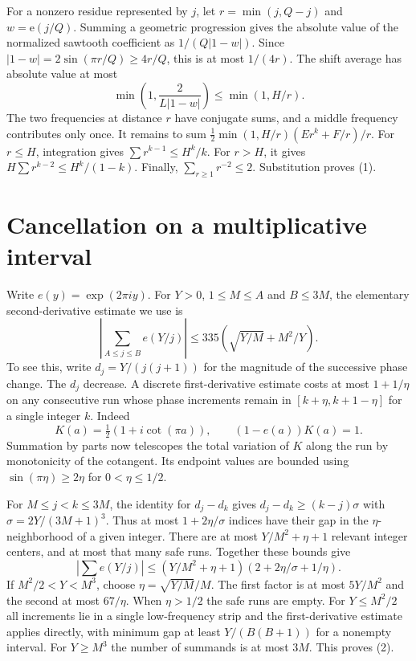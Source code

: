 \documentclass[10pt]{article}
\newcommand{\ee}{\mathrm{e}}
\begin{document}
For a nonzero residue represented by $j$, let $r=\min(j,Q-j)$ and $w=\ee(j/Q)$. Summing a geometric progression gives the absolute value of the normalized sawtooth coefficient as $1/(Q|1-w|)$. Since $|1-w|=2\sin(\pi r/Q)\ge4r/Q$, this is at most $1/(4r)$. The shift average has absolute value at most
\[
 \min\left(1,\frac{2}{L|1-w|}\right)\le\min(1,H/r).
\]
The two frequencies at distance $r$ have conjugate sums, and a middle frequency contributes only once. It remains to sum $\tfrac12\min(1,H/r)(E r^k+F/r)/r$. For $r\le H$, integration gives $\sum r^{k-1}\le H^k/k$. For $r>H$, it gives $H\sum r^{k-2}\le H^k/(1-k)$. Finally, $\sum_{r\ge1}r^{-2}\le2$. Substitution proves (1).

\newpage
\section*{Cancellation on a multiplicative interval}
Write $e(y)=\exp(2\pi i y)$. For $Y>0$, $1\le M\le A$ and $B\le3M$, the elementary second-derivative estimate we use is
\begin{equation}
 \left|\sum_{A\le j\le B}e(Y/j)\right|\le335\left(\sqrt{Y/M}+M^2/Y\right).
 \tag{2}
\end{equation}
To see this, write $d_j=Y/(j(j+1))$ for the magnitude of the successive phase change. The $d_j$ decrease. A discrete first-derivative estimate costs at most $1+1/\eta$ on any consecutive run whose phase increments remain in $[k+\eta,k+1-\eta]$ for a single integer $k$. Indeed
\[
 K(a)=\tfrac12(1+i\cot(\pi a)),\qquad (1-e(a))K(a)=1 .
\]
Summation by parts now telescopes the total variation of $K$ along the run by monotonicity of the cotangent. Its endpoint values are bounded using $\sin(\pi\eta)\ge2\eta$ for $0<\eta\le1/2$.

For $M\le j<k\le3M$, the identity for $d_j-d_k$ gives $d_j-d_k\ge(k-j)\sigma$ with $\sigma=2Y/(3M+1)^3$. Thus at most $1+2\eta/\sigma$ indices have their gap in the $\eta$-neighborhood of a given integer. There are at most $Y/M^2+\eta+1$ relevant integer centers, and at most that many safe runs. Together these bounds give
\[
 \left|\sum e(Y/j)\right|\le(Y/M^2+\eta+1)
     (2+2\eta/\sigma+1/\eta).
\]
If $M^2/2<Y<M^3$, choose $\eta=\sqrt{Y/M}/M$. The first factor is at most $5Y/M^2$ and the second at most $67/\eta$. When $\eta>1/2$ the safe runs are empty. For $Y\le M^2/2$ all increments lie in a single low-frequency strip and the first-derivative estimate applies directly, with minimum gap at least $Y/(B(B+1))$ for a nonempty interval. For $Y\ge M^3$ the number of summands is at most $3M$. This proves (2).
\end{document}
